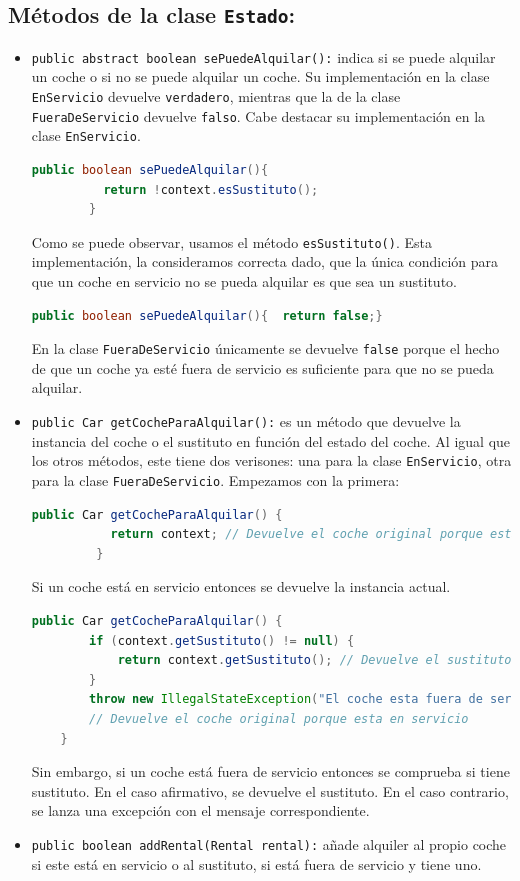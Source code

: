 \subsection*{Métodos de la clase \texttt{Estado}:}
\begin{itemize}
    \item \texttt{public abstract boolean sePuedeAlquilar():} indica si se puede alquilar un coche o si no se puede alquilar un coche. Su implementación en la clase \texttt{EnServicio} 
    devuelve \texttt{verdadero}, mientras que la de la clase \texttt{FueraDeServicio} devuelve \texttt{falso}. Cabe destacar su implementación en la clase \texttt{EnServicio}.
    \begin{lstlisting}[style = javaNormal, language=Java]
        public boolean sePuedeAlquilar(){
          return !context.esSustituto();
        }    
    \end{lstlisting}
    Como se puede observar, usamos el método \texttt{esSustituto()}. Esta implementación, la consideramos correcta dado, que la única condición para 
    que un coche en servicio no se pueda alquilar es que sea un sustituto.
    \begin{lstlisting}[style = javaNormal, language=Java]
        public boolean sePuedeAlquilar(){  return false;}  
    \end{lstlisting}    
    En la clase \texttt{FueraDeServicio} únicamente se devuelve \texttt{false} porque el hecho de que un coche ya esté fuera de servicio es suficiente para que no se pueda alquilar.
    
    \item \texttt{public Car getCocheParaAlquilar():} es un método que devuelve la instancia del coche o el sustituto en función 
    del estado del coche. Al igual que los otros métodos, este tiene dos verisones: una para la clase \texttt{EnServicio}, otra para la clase \texttt{FueraDeServicio}. Empezamos con la primera:
    \begin{lstlisting}[style = javaNormal, language=Java]
        public Car getCocheParaAlquilar() {
           return context; // Devuelve el coche original porque esta en servicio
         }
    \end{lstlisting} 
    Si un coche está en servicio entonces se devuelve la instancia actual.
    \begin{lstlisting}[style = javaNormal, language=Java]
        public Car getCocheParaAlquilar() {
        if (context.getSustituto() != null) {
            return context.getSustituto(); // Devuelve el sustituto si existe
        }
        throw new IllegalStateException("El coche esta fuera de servicio y no tiene sustituto");
        // Devuelve el coche original porque esta en servicio
    }
    \end{lstlisting} 
    Sin embargo, si un coche está fuera de servicio entonces se comprueba si tiene sustituto. En el caso afirmativo, se devuelve el sustituto. En el caso contrario, se lanza una excepción con el mensaje correspondiente. 
    \item \texttt{public boolean addRental(Rental rental):} añade alquiler al propio coche si este está en servicio o al sustituto, si está fuera
    de servicio y tiene uno.


\end{itemize}
